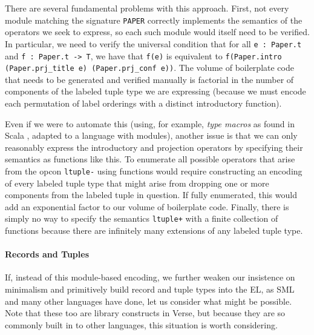 There are several fundamental problems with this approach. First, not every module matching the signature \lstinline{PAPER} correctly implements the semantics of the operators we seek to express, so each such module would itself need to be verified. In particular, we need to verify the universal condition that for all \lstinline{e : Paper.t} and \lstinline{f : Paper.t -> T}, we have that \lstinline{f(e)} is equivalent to \lstinline{f(Paper.intro (Paper.prj_title e) (Paper.prj_conf e))}. The volume of boilerplate code that needs to be generated and verified manually is factorial in the number of components of the labeled tuple type we are expressing (because we must encode each permutation of label orderings with a distinct introductory function).%

Even if we were to automate this (using, for example, \emph{type macros} as found in Scala \cite{ScalaMacros2013}, adapted to a language with modules), another issue is that we can only reasonably express the introductory and projection operators by specifying their semantics as functions like this. To enumerate all possible operators that arise from the opcon \lstinline{ltuple-} using functions would require constructing an encoding of every labeled tuple type that might arise from dropping one or more components from the labeled tuple in question. If fully enumerated, this would add an  exponential factor to our volume of boilerplate code. 
Finally, there is simply no way to specify the semantics \lstinline{ltuple+} with a finite collection of functions because there are infinitely many extensions of any labeled tuple type. %


\paragraph{Records and Tuples}
If, instead of this module-based encoding, we further weaken our insistence on minimalism and primitively build record and tuple types into the EL, as SML and many other languages have done, let us consider what might be possible. Note that these too are library constructs in Verse, but because they are so commonly built in to other languages, this situation is worth considering.%

